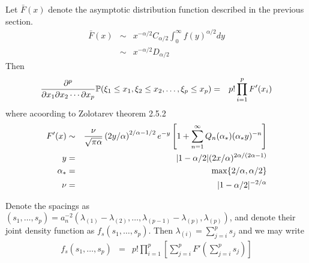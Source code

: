 \documentclass{article}
\begin{document}
Let $\bar{F}(x)$ denote the asymptotic distribution function described in the previous section.
\begin{eqnarray*}
  \bar{F}(x) &\sim& x^{-\alpha/2} C_{\alpha/2} \int_0^\infty f(y)^{\alpha/2} dy  \\
  &\sim& x^{-\alpha/2} D_{\alpha/2}
\end{eqnarray*}
Then
\begin{eqnarray*}
\frac{\partial^p}{\partial x_1\partial x_2 \cdots \partial x_p}
\P(\xi_1 \leq x_1, \xi_2 \leq x_2, \dots, \xi_p \leq x_p)
&=& p! \prod_{i=1}^p F'(x_i)
\end{eqnarray*}
where acoording to Zolotarev \cite{Zolotarev1983} theorem 2.5.2
\begin{eqnarray*}
  F'(x) &\sim& {\nu \over \sqrt{\pi \alpha}} \left(2y/\alpha\right)^{2/\alpha - 1/2}
  e^{-y} \left[
    1 + \sum_{n=1}^\infty Q_n(\alpha_*) (\alpha_* y)^{-n}
  \right] \\
  y &=& |1 - \alpha/2|(2x/\alpha)^{2\alpha/(2\alpha-1)}\\
  \alpha_* &=& \max\{2/\alpha, \alpha/2\} \\
  \nu &=& |1 - \alpha/2|^{-2/\alpha}
\end{eqnarray*}

Denote the spacings as $(s_1, \dots, s_p) = a_n^{-2} (\lambda_{(1)} - \lambda_{(2)}, \dots,
\lambda_{(p-1)} - \lambda_{(p)}, \lambda_{(p)})$, and denote their joint density function as
$f_s(s_1, \dots, s_p)$. Then $\lambda_{(i)} = \sum_{j=i}^p s_j$ and we may write
\begin{eqnarray*}
  f_s(s_1, \dots, s_p) &=& p! \prod_{i=1}^p \left[
                           \sum_{j=i}^p F'\left(\sum_{j=i}^p s_j\right)
                           \right]
\end{eqnarray*}


\end{document}
